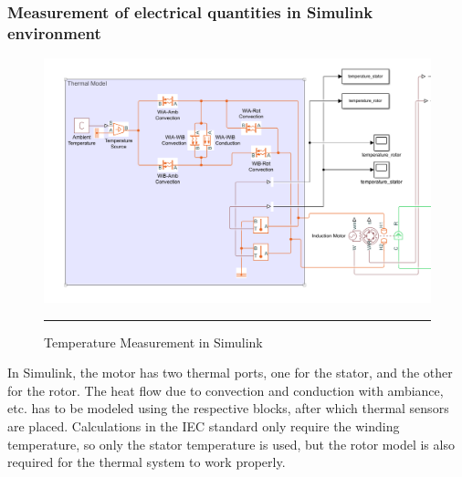 \subsubsection{Measurement of electrical quantities in Simulink environment}
\begin{figure}[htbp]
	\centering
		\includegraphics[width = 4.5in]{./Figures/MS/fig329.png}
		\rule{35em}{0.5pt}
	\caption{Temperature Measurement in Simulink}
	\label{fig:Temperature Measurement in Simulink} 
\end{figure}
In Simulink, the motor has two thermal ports, one for the stator, and the other for the rotor. The heat flow due to convection and conduction with ambiance, etc. has to be modeled using the respective blocks, after which thermal sensors are placed. Calculations in the IEC standard only require the winding temperature, so only the stator temperature is used, but the rotor model is also required for the thermal system to work properly.